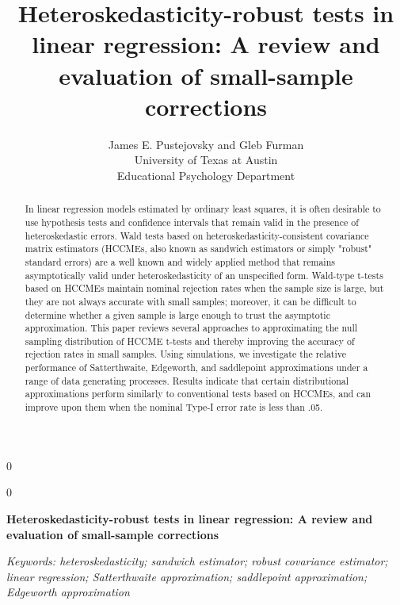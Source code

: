 \documentclass[12pt]{article}\usepackage[]{graphicx}\usepackage[]{color}
\newcommand{\blind}{0}
\newcommand{\MyTitle}{Heteroskedasticity-robust tests in linear regression: A review and evaluation of small-sample corrections}
\begin{document}
%

\def\spacingset#1{\renewcommand{\baselinestretch}%
{#1}\small\normalsize} \spacingset{1}



\blind
{
  \title{\bf \MyTitle}
  \author{James E. Pustejovsky and Gleb Furman \\
    University of Texas at Austin \\
    Educational Psychology Department}
  \maketitle
} \fi

\blind
{
  \bigskip
  \bigskip
  \bigskip
  \begin{center}
    {\LARGE\bf \MyTitle}
\end{center}
  \medskip
} \fi

\bigskip
\begin{abstract}
In linear regression models estimated by ordinary least squares, it is often desirable to use hypothesis tests and confidence intervals that remain valid in the presence of heteroskedastic errors. 
Wald tests based on heteroskedasticity-consistent covariance matrix estimators (HCCMEs, also known as sandwich estimators or simply "robust" standard errors) are a well known and widely applied method that remains asymptotically valid under heteroskedasticity of an unspecified form.
Wald-type t-tests based on HCCMEs maintain nominal rejection rates when the sample size is large, but they are not always accurate with small samples; moreover, it can be difficult to determine whether a given sample is large enough to trust the asymptotic approximation.
This paper reviews several approaches to approximating the null sampling distribution of HCCME t-tests and thereby improving the accuracy of rejection rates in small samples.
Using simulations, we investigate the relative performance of Satterthwaite, Edgeworth, and saddlepoint approximations under a range of data generating processes.
Results indicate that certain distributional approximations perform similarly to conventional tests based on HCCMEs, and can improve upon them when the nominal Type-I error rate is less than .05. 
\end{abstract}

\noindent%
{\it Keywords: heteroskedasticity; sandwich estimator; robust covariance estimator; linear regression; Satterthwaite approximation; saddlepoint approximation; Edgeworth approximation} 
\vfill
\end{document}
